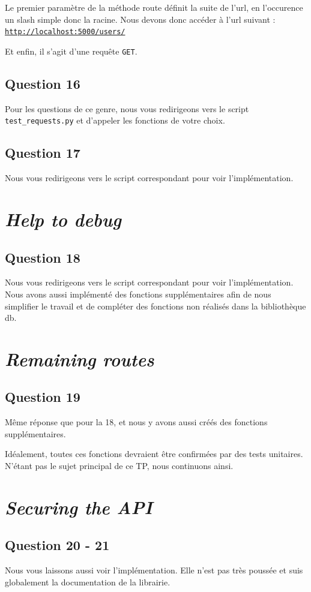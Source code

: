 \documentclass{ceri/sty/rapport}
\begin{document}
Le premier paramètre de la méthode route définit la suite de l'url, en l'occurence un slash simple donc la racine. Nous devons donc accéder à l'url suivant : \texttt{\url{http://localhost:5000/users/}}

Et enfin, il s'agit d'une requête \texttt{GET}.

\subsection{Question 16}
Pour les questions de ce genre, nous vous redirigeons vers le script \texttt{test\_requests.py} et d'appeler les fonctions de votre choix.

\subsection{Question 17}
Nous vous redirigeons vers le script correspondant pour voir l'implémentation.

\section{\textit{Help to debug}}
\subsection{Question 18}
Nous vous redirigeons vers le script correspondant pour voir l'implémentation.
Nous avons aussi implémenté des fonctions supplémentaires afin de nous simplifier le travail et de compléter des fonctions non réalisés dans la bibliothèque db.

\section{\textit{Remaining routes}}
\subsection{Question 19}
Même réponse que pour la 18, et nous y avons aussi créés des fonctions supplémentaires.

Idéalement, toutes ces fonctions devraient être confirmées par des tests unitaires.
N'étant pas le sujet principal de ce TP, nous continuons ainsi.

\section{\textit{Securing the API}}
\subsection{Question 20 - 21}
Nous vous laissons aussi voir l'implémentation. 
Elle n'est pas très poussée et suis globalement la documentation de la librairie.
\end{document}
